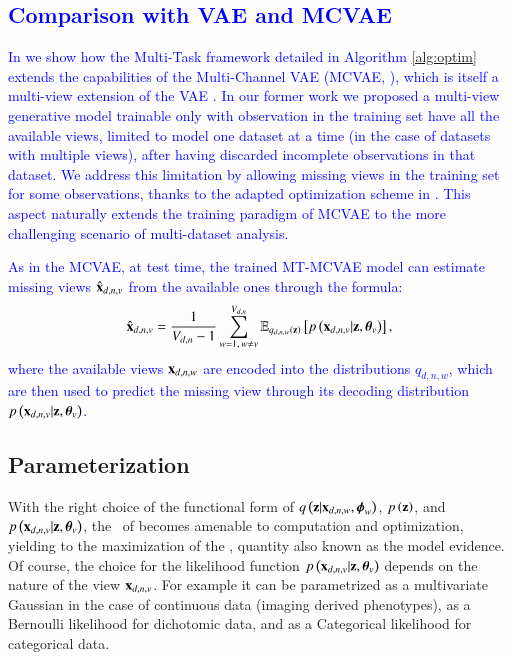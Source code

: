 \textcolor{blue}{
	\subsection{Comparison with VAE and MCVAE}
	\label{ssec:comparison}
	In  we show how the Multi-Task framework detailed in Algorithm \ref{alg:optim} extends the capabilities of the Multi-Channel VAE (MCVAE, \cite{Antelmi2019}), which is itself a multi-view extension of the VAE \citep{Kingma2013,Rezende2014}.
	In our former work we proposed a multi-view generative model trainable only with observation in the training set have all the available views, limited to model one dataset at a time (in the case of datasets with multiple views), after having discarded incomplete observations in that dataset.
	We address this limitation by allowing missing views in the training set for some observations, thanks to the adapted optimization scheme in .
	This aspect naturally extends the training paradigm of MCVAE to the more challenging scenario of multi-dataset analysis.
	
	As in the MCVAE, at test time, the trained MT-MCVAE model can estimate missing views $\hat{\mathbf{x}}_{d,n,v}$ from the available ones through the formula:
	\begin{equation}\label{eq:reconstruction}
	\begin{aligned}
	\hat{\mathbf{x}}_{d,n,v} = \frac{1}{V_{d, n}-1} \sum_{w=1, \,w\neq v}^{V_{d, n}} \operatorname{\mathbb{E}}_{q_{d,n,w}(\mathbf{z})}\left[p\left(\mathbf{x}_{d,n,v}|\mathbf{z}, \boldsymbol{\theta}_v\right)\right],
	\end{aligned}
	\end{equation}
	where the available views $\mathbf{x}_{d,n,w}$ are encoded into the distributions $q_{d,n,w}$, which are then used to predict the missing view through its decoding distribution $p\left(\mathbf{x}_{d,n,v}|\mathbf{z}, \boldsymbol{\theta}_v\right)$.
}

\subsection{Parameterization}
\label{ssec:parameterization}

With the right choice of the functional form of $q\left(\mathbf{z}|\mathbf{x}_{d,n,w}, \boldsymbol{\phi}_w\right)$, $p\left(\mathbf{z}\right)$, and $p\left(\mathbf{x}_{d,n,v}|\mathbf{z}, \boldsymbol{\theta}_v\right)$, the \rhs\ of  becomes amenable to computation and optimization, yielding to the maximization of the \lhs, quantity also known as the model evidence.
Of course, the choice for the likelihood function $p\left(\mathbf{x}_{d,n,v}|\mathbf{z}, \boldsymbol{\theta}_v\right)$ depends on the nature of the view $\mathbf{x}_{d,n,v}$.
For example it can be parametrized as a multivariate Gaussian in the case of continuous data (\ie imaging derived phenotypes), as a Bernoulli likelihood for dichotomic data, and as a Categorical likelihood for categorical data.

